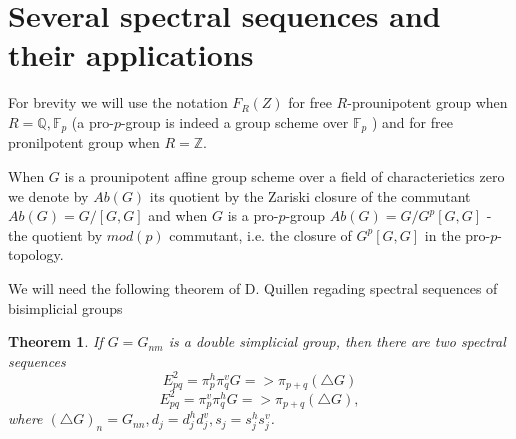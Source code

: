 \documentclass[11pt,a4paper]{article}
\newtheorem{theorem}{Theorem}[section] %
\begin{document}
\section{Several spectral sequences and their applications}\label{Spectral}
For brevity we will use the notation $F_R(Z)$ for free $R$-prounipotent group when $R=\mathbb{Q}, \mathbb{F}_p$ (a pro-$p$-group is indeed a group scheme over $\mathbb{F}_p$ \cite[4.1]{Mikh2023}) and for free pronilpotent group when $R=\mathbb{Z}$.

When $G$ is a prounipotent affine group scheme over a field of characterietics zero we denote by $Ab(G)$ its quotient by the Zariski closure of the commutant $Ab(G)=G/[G,G]$ and when $G$ is a pro-$p$-group $Ab(G)=G/G^p[G,G]$ - the quotient  by $mod(p)$ commutant, i.e. the closure of $G^p[G,G]$ in the pro-$p$-topology.

We will need the following theorem of D. Quillen \cite{QUILLEN} regading spectral sequences of bisimplicial groups
\begin{theorem}\label{qt} If $G=G_{nm}$ is a double simplicial group, then there are two spectral sequences
$$E^2_{pq}=\pi^h_p\pi^v_q G => \pi_{p+q}(\triangle G)$$
$$E^2_{pq}=\pi^v_p\pi^h_q G =>\pi_{p+q}(\triangle G),$$
where $(\triangle G)_n=G_{nn}, d_j=d_j^hd^v_j, s_j=s^h_j s^v_j$.
\end{theorem}
\end{document}
